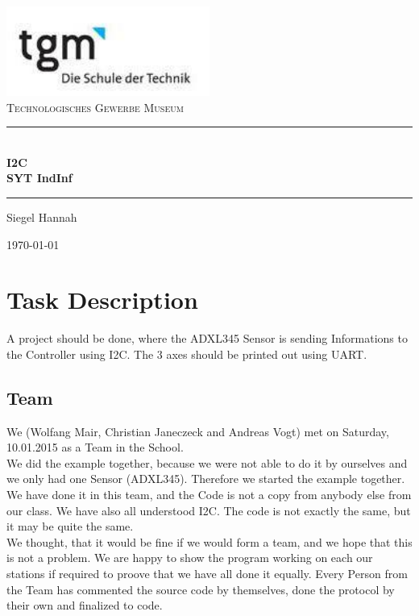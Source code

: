 \documentclass[12pt]{article}
\begin{document}
\begin{titlepage}
\begin{center}
\includegraphics[width=0.5\textwidth]{images/logo}\\[1cm]    

\textsc{\LARGE Technologisches Gewerbe Museum}\\[1.5cm]

\rule{12cm}{1mm}
{ \huge \bfseries  \\ \huge I2C \\ \large SYT IndInf\\[0.4cm] }

\rule{12cm}{1mm}

\noindent 
\vspace{5cm}

\begin{center}
\large
Siegel Hannah 
\end{center}

\vfill

{\large \today}

\end{center}
\end{titlepage}

\tableofcontents


\ohead{\headmark}

\newpage


\section{Task Description}
A project should be done, where the ADXL345 Sensor is sending Informations to the Controller using I2C.
The 3 axes should be printed out using UART. 
\subsection{Team}
We (Wolfang Mair, Christian Janeczeck and Andreas Vogt) met on Saturday, 10.01.2015 as a Team in the School. \\
We did the example together, because we were not able to do it by ourselves and we only had one Sensor (ADXL345).
Therefore we started the example together. We have done it in this team, and the Code is not a copy from anybody else from our class. We have also all understood I2C. The code is not exactly the same, but it may be quite the same. \\
We thought, that it would be fine if we would form a team, and we hope that this is not a problem. We are happy to show the program working on each our stations if required to proove that we have all done it equally.
Every Person from the Team has commented the source code by themselves, done the protocol by their own and finalized to code.
\end{document}
